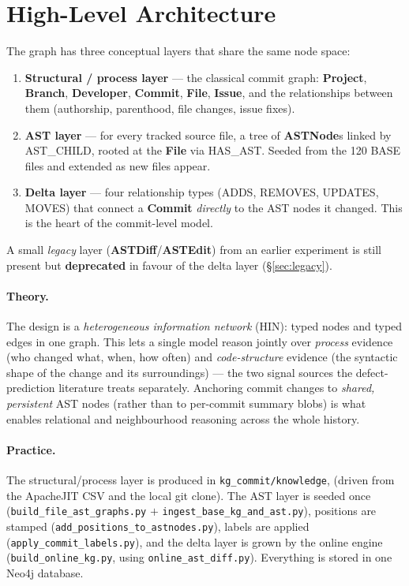 \documentclass[11pt,a4paper]{article}
\newcommand{\node}[1]{\textcolor{kgblue}{\textbf{#1}}}
\newcommand{\edge}[1]{\textsc{#1}}
\begin{document}
	\section{High-Level Architecture}
	The graph has three conceptual layers that share the same node space:
	
	\begin{enumerate}[nosep]
		\item \textbf{Structural / process layer} --- the classical commit graph:
		\node{Project}, \node{Branch}, \node{Developer}, \node{Commit},
		\node{File}, \node{Issue}, and the relationships between them
		(authorship, parenthood, file changes, issue fixes).
		\item \textbf{AST layer} --- for every tracked source file, a tree of
		\node{ASTNode}s linked by \edge{AST\_CHILD}, rooted at the \node{File}
		via \edge{HAS\_AST}. Seeded from the 120 BASE files and extended as new
		files appear.
		\item \textbf{Delta layer} --- four relationship types
		(\edge{ADDS}, \edge{REMOVES}, \edge{UPDATES}, \edge{MOVES}) that connect
		a \node{Commit} \emph{directly} to the AST nodes it changed. This is the
		heart of the commit-level model.
	\end{enumerate}
	
	A small \emph{legacy} layer (\node{ASTDiff}/\node{ASTEdit}) from an earlier
	experiment is still present but \textbf{deprecated} in favour of the delta layer
	(\S\ref{sec:legacy}).
	
	\paragraph{Theory.} The design is a \emph{heterogeneous information network}
	(HIN): typed nodes and typed edges in one graph. This lets a single model reason
	jointly over \emph{process} evidence (who changed what, when, how often) and
	\emph{code-structure} evidence (the syntactic shape of the change and its
	surroundings) --- the two signal sources the defect-prediction literature treats
	separately. Anchoring commit changes to \emph{shared, persistent} AST nodes
	(rather than to per-commit summary blobs) is what enables relational and
	neighbourhood reasoning across the whole history.
	
	\paragraph{Practice.} The structural/process layer is produced in \texttt{kg\_commit/knowledge}, (driven from the ApacheJIT CSV
	and the local git clone). The AST layer is seeded once
	(\texttt{build\_file\_ast\_graphs.py} $+$ \texttt{ingest\_base\_kg\_and\_ast.py}),
	positions are stamped (\texttt{add\_positions\_to\_astnodes.py}), labels are
	applied (\texttt{apply\_commit\_labels.py}), and the delta layer is grown by the
	online engine (\texttt{build\_online\_kg.py}, using
	\texttt{online\_ast\_diff.py}). Everything is stored in one Neo4j database.
	
\end{document}
